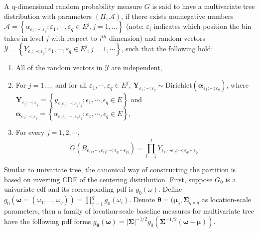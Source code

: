 \begin{deff}
  A q-dimensional random probability measure $G$ is said to have a
  multivariate \polya{} tree distribution with parameters $(\Pi,
  \mathcal{A})$, if there exists nonnegative numbers
  $\mathcal{A}=\left\{ \alpha_{\varepsilon_1;\cdots;\varepsilon_q} ;
    \varepsilon_1, \cdots, \varepsilon_q \in E^j, j=1, \ldots
  \right\}$ (note: $\varepsilon_i$ indicates which position the bin
  takes in level $j$ with respect to $i^{th}$ dimension) and random
  vectors $\mathcal{Y} = \left\{
    Y_{\varepsilon_1;\cdots;\varepsilon_q} ; \varepsilon_1, \cdots,
    \varepsilon_q \in E^j, j=1, \cdots \right\}$, such that the
  following hold:
  \begin{enumerate}
  \item All of the random vectors in $\mathcal{Y}$ are independent,
  \item For $j=1, \ldots$ and for all $\varepsilon_1, \cdots,
    \varepsilon_q \in E^j$,
    $\bm{Y}_{\varepsilon_1;\cdots;\varepsilon_q} \sim
    \mathrm{Dirichlet}\left( \bm{\alpha}_{\varepsilon_1; \cdots;
        \varepsilon_q} \right)$, where
    $\bm{Y}_{\varepsilon_1;\cdots;\varepsilon_q} = \left\{
      y_{\varepsilon_1\epsilon_1; \cdots; \varepsilon_q\epsilon_q};
      \epsilon_1, \cdots, \epsilon_q \in E \right\}$ and
    $\bm{\alpha}_{\varepsilon_1; \cdots; \varepsilon_q} = \left\{
      \alpha_{\varepsilon_1\epsilon_1; \cdots;
        \varepsilon_q\epsilon_q}; \epsilon_1, \cdots, \epsilon_q \in E
    \right\}$,
  \item For every $j=1,2, \cdots$,
    \begin{displaymath}
      G(B_{\epsilon_{11},\cdots,
        \epsilon_{1j};\cdots;\epsilon_{q1}\cdots\epsilon_{qj}}) =
      \prod_{l=1}^j Y_{\epsilon_{11}\cdots \epsilon_{1l}; \cdots ;
        \epsilon_{q1}\cdots\epsilon_{ql}}.
    \end{displaymath}
  \end{enumerate}
\end{deff}

Similar to univariate \polya{} tree, the canonical way of
constructing the partition is based on inverting CDF of the centering
distribution. First, suppose $G_0$ is a univariate cdf and its
corresponding pdf is $g_0(\omega)$. Define $g_0(\bm{\omega}=(\omega_1,
\ldots, \omega_q)) = \prod_{i=1}^q g_0(\omega_i)$. Denote
$\bm{\theta}= (\bm{\mu}_q, \bm{\Sigma}_{q\times q}$ as location-scale
parameters, then a family of location-scale baseline measures for
multivariate \polya{} tree have the following pdf forms
$g_{\bm{\theta}} ( \bm{\omega}) = |\bm{\Sigma}|^{-1/2} g_0 (
\bm{\Sigma}^{-1/2} (\bm{\omega} - \bm{\mu}) ) $.

